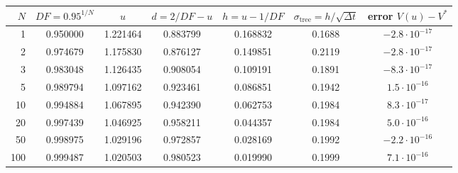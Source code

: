 \documentclass[11pt,a4paper]{article}
\begin{document}
\begin{center}
\small
\begin{tabular}{rcccccc}
\toprule
$N$ & $DF=0.95^{1/N}$ & $u$ & $d=2/DF-u$ & $h=u-1/DF$ & $\sigma_{\text{tree}}=h/\sqrt{\Delta t}$ & error $V(u)-V^*$\\
\midrule
1 & 0.950000 & 1.221464 & 0.883799 & 0.168832 & 0.1688 & $-2.8\cdot10^{-17}$\\
2 & 0.974679 & 1.175830 & 0.876127 & 0.149851 & 0.2119 & $-2.8\cdot10^{-17}$\\
3 & 0.983048 & 1.126435 & 0.908054 & 0.109191 & 0.1891 & $-8.3\cdot10^{-17}$\\
5 & 0.989794 & 1.097162 & 0.923461 & 0.086851 & 0.1942 & $1.5\cdot10^{-16}$\\
10 & 0.994884 & 1.067895 & 0.942390 & 0.062753 & 0.1984 & $8.3\cdot10^{-17}$\\
20 & 0.997439 & 1.046925 & 0.958211 & 0.044357 & 0.1984 & $5.0\cdot10^{-16}$\\
50 & 0.998975 & 1.029196 & 0.972857 & 0.028169 & 0.1992 & $-2.2\cdot10^{-16}$\\
100 & 0.999487 & 1.020503 & 0.980523 & 0.019990 & 0.1999 & $7.1\cdot10^{-16}$\\
\bottomrule
\end{tabular}
\label{tab:A}
\end{center}
\end{document}
